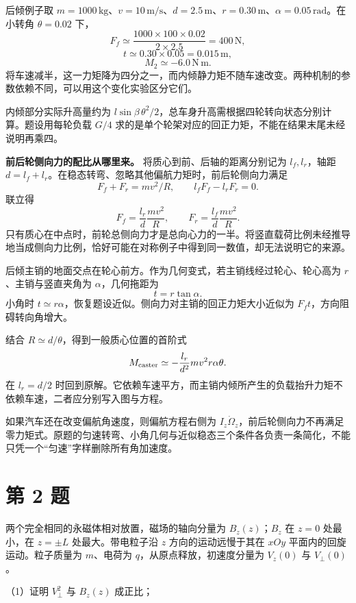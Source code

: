 \documentclass[12pt,a4paper,UTF8]{ctexart}
\begin{document}
后倾例子取
\(m=1000\,\mathrm{kg}\)、\(v=10\,\mathrm{m/s}\)、\(d=2.5\,\mathrm m\)、\(r=0.30\,\mathrm m\)、\(\alpha=0.05\,\mathrm{rad}\)。在小转角
\(\theta=0.02\) 下， \[
F_f\simeq\frac{1000\times100\times0.02}{2\times2.5}=400\,\mathrm N,
\] \[
t\simeq0.30\times0.05=0.015\,\mathrm m,
\] \[
M_2\simeq-6.0\,\mathrm{N\,m}.
\]
将车速减半，这一力矩降为四分之一，而内倾静力矩不随车速改变。两种机制的参数依赖不同，可以用这个变化实验区分它们。

内倾部分实际升高量约为
\(l\sin\beta\,\theta^2/2\)，总车身升高需根据四轮转向状态分别计算。题设用每轮负载
\(G/4\) 求的是单个轮架对应的回正力矩，不能在结果末尾未经说明再乘四。

\textbf{前后轮侧向力的配比从哪里来。} 将质心到前、后轴的距离分别记为
\(l_f,l_r\)，轴距
\(d=l_f+l_r\)。在稳态转弯、忽略其他偏航力矩时，前后轮侧向力满足 \[
F_f+F_r=mv^2/R,
\qquad l_fF_f-l_rF_r=0.
\] 联立得 \[
F_f=\frac{l_r}{d}\frac{mv^2}{R},
\qquad F_r=\frac{l_f}{d}\frac{mv^2}{R}.
\]
只有质心在中点时，前轮总侧向力才是总向心力的一半。将竖直载荷比例未经推导地当成侧向力比例，恰好可能在对称例子中得到同一数值，却无法说明它的来源。

后倾主销的地面交点在轮心前方。作为几何变式，若主销线经过轮心、轮心高为
\(r\)、主销与竖直夹角为 \(\alpha\)，几何拖距为 \[
t=r\tan\alpha.
\] 小角时
\(t\simeq r\alpha\)，恢复题设近似。侧向力对主销的回正力矩大小近似为
\(F_ft\)，方向阻碍转向角增大。

结合 \(R\simeq d/\theta\)，得到一般质心位置的首阶式 \[
M_{\rm caster}\simeq-\frac{l_r}{d^2}mv^2r\alpha\theta.
\] 在 \(l_r=d/2\)
时回到原解。它依赖车速平方，而主销内倾所产生的负载抬升力矩不依赖车速，二者应分别写入图与方程。

如果汽车还在改变偏航角速度，则偏航方程右侧为
\(I_z\dot\Omega_z\)，前后轮侧向力不再满足零力矩式。原题的匀速转弯、小角几何与近似稳态三个条件各负责一条简化，不能只凭一个``匀速''字样删除所有角加速度。

\newpage

\section{第 2 题}\label{ux7b2c-2-ux9898}

两个完全相同的永磁体相对放置，磁场的轴向分量为 \(B_z(z)\)；\(B_z\) 在
\(z=0\) 处最小，在 \(z=\pm L\) 处最大。带电粒子沿 \(z\)
方向的运动远慢于其在 \(xOy\) 平面内的回旋运动。粒子质量为 \(m\)、电荷为
\(q\)，从原点释放，初速度分量为 \(V_z(0)\) 与 \(V_\perp(0)\)。

（1）证明 \(V_\perp^2\) 与 \(B_z(z)\) 成正比；
\end{document}
